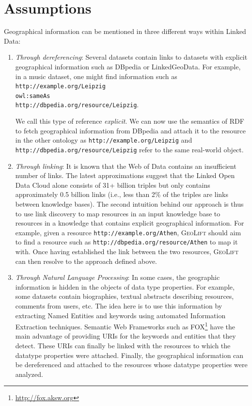 \documentclass[a4paper,twoside,bibtotoc,abstracton,12pt,BCOR=15mm]{article}
\newcommand{\geolift}{\textsc{GeoLift}\xspace}
\begin{document}
\section{Assumptions}
Geographical information can be mentioned in three different ways within Linked Data:
\begin{enumerate}
\item \emph{Through dereferencing}: Several datasets contain links to datasets with explicit geographical information such as DBpedia or LinkedGeoData. 
For example, in a music dataset, one might find information such as\\ 
\texttt{http://example.org/Leipzig \\
owl:sameAs \\ 
http://dbpedia.org/resource/Leipzig}.

We call this type of reference \emph{explicit}. 
We can now use the semantics of RDF to fetch geographical information from DBpedia and attach it to the resource in the other ontology as \texttt{http://example.org/Leipzig} and \texttt{http://dbpedia.org/resource/Leipzig} refer to the same real-world object.

\item \emph{Through linking}: It is known that the Web of Data contains an insufficient number of links. 
The latest approximations suggest that the Linked Open Data Cloud alone consists of 31+ billion triples but only contains approximately 0.5 billion links (i.e., less than 2\% of the triples are links between knowledge bases). 
The second intuition behind our approach is thus to use link discovery to map resources in an input knowledge base to resources in a knowledge that contains explicit geographical information. 
For example, given a resource \texttt{http://example.org/Athen}, \geolift should aim to find a resource such as \texttt{http://dbpedia.org/resource/Athen} to map it with. 
Once having established the link between the two resources, \geolift can then resolve to the approach defined above.

\item \emph{Through Natural Language Processing}: In some cases, the geographic information is hidden in the objects of data type properties. 
For example, some datasets contain biographies, textual abstracts describing resources, comments from users, etc.
The idea here is to use this information by extracting Named Entities and keywords using automated Information Extraction techniques.
Semantic Web Frameworks such as FOX\footnote{\url{http://fox.aksw.org}} have the main advantage of providing URIs for the keywords and entities that they detect.
These URIs can finally be linked with the resources to which the datatype properties were attached.
Finally, the geographical information can be dereferenced and attached to the resources whose datatype properties were analyzed.
\end{enumerate}
\end{document}
